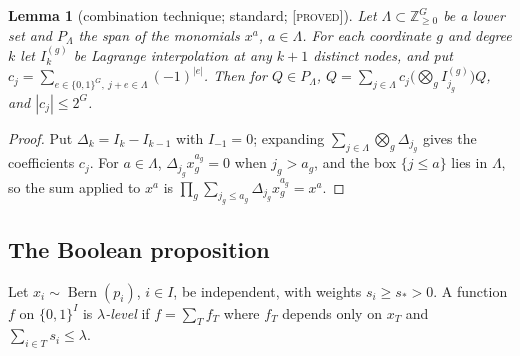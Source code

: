 \documentclass[10pt,reqno]{amsart}
\newtheorem{lemma}[theorem]{Lemma}
\theoremstyle{definition}
\theoremstyle{remark}
\newcommand{\Z}{\mathbb Z}
\newcommand{\Bern}{\operatorname{Bern}}
\newcommand{\lab}[1]{\textup{[\textsc{#1}]}}
\begin{document}
\begin{lemma}[combination technique; standard; \lab{proved}]\label{lem:comb}
Let $\Lambda\subset\Z_{\geq0}^G$ be a lower set and $P_\Lambda$ the span of
the monomials $x^a$, $a\in\Lambda$.  For each coordinate $g$ and degree $k$
let $I^{(g)}_k$ be Lagrange interpolation at any $k+1$ distinct nodes, and
put $c_j=\sum_{e\in\{0,1\}^G,\ j+e\in\Lambda}(-1)^{|e|}$.  Then for
$Q\in P_\Lambda$,
$Q=\sum_{j\in\Lambda}c_j\bigl(\bigotimes_gI^{(g)}_{j_g}\bigr)Q$, and
$|c_j|\leq2^G$.
\end{lemma}
\begin{proof}
Put $\Delta_k=I_k-I_{k-1}$ with $I_{-1}=0$; expanding
$\sum_{j\in\Lambda}\bigotimes_g\Delta_{j_g}$ gives the coefficients $c_j$.
For $a\in\Lambda$, $\Delta_{j_g}x_g^{a_g}=0$ when $j_g>a_g$, and the box
$\{j\leq a\}$ lies in $\Lambda$, so the sum applied to $x^a$ is
$\prod_g\sum_{j_g\leq a_g}\Delta_{j_g}x_g^{a_g}=x^a$.
\end{proof}

\subsection{The Boolean proposition}
Let $x_i\sim\Bern(p_i)$, $i\in I$, be independent, with weights
$s_i\geq s_*>0$.  A function $f$ on $\{0,1\}^I$ is \emph{$\lambda$-level} if
$f=\sum_Tf_T$ where $f_T$ depends only on $x_T$ and
$\sum_{i\in T}s_i\leq\lambda$.
\end{document}
